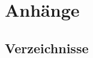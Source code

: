 %
\clearpage
\newpage
\appendix
\section{Anhänge}
\subsection{Verzeichnisse}
	\listoffigures	
	


	

